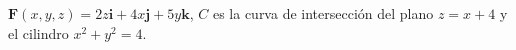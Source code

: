 \item $\mathbf{F}(x, y, z) = 2z \mathbf{i} + 4x \mathbf{j} + 5y \mathbf{k}$, $C$ es la curva de intersección del plano $z = x + 4$ y el cilindro $x^2 + y^2 = 4$.
